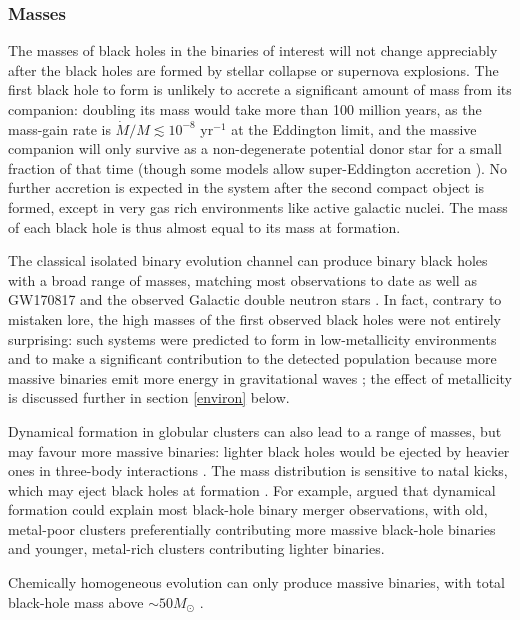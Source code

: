 \documentclass[review]{elsarticle}
\begin{document}
\subsubsection{Masses}
The masses of black holes in the binaries of interest will not change appreciably after the black holes are formed by stellar collapse or supernova explosions.  The first black hole to form is unlikely to accrete a significant amount of mass from its companion: doubling its mass would take more than 100 million years, as the mass-gain rate is $\dot{M}/M \lesssim 10^{-8}$ yr$^{-1}$ at the Eddington limit, and the massive companion will only survive as a non-degenerate potential donor star for a small fraction of that time (though some models allow super-Eddington accretion \cite{Eldridge:2017,Bavera:2020,vanSon:2020}). No further accretion is expected in the system after the second compact object is formed, except in very gas rich environments like active galactic nuclei. The mass of each black hole is thus almost equal to its mass at formation. 

The classical isolated binary evolution channel can produce binary black holes with a broad range of masses, matching most observations to date \citep[e.g.,][]{Stevenson:2017,Eldridge:2017,GiacobboMapelli:2018} as well as GW170817 and the observed Galactic double neutron stars \citep[e.g.,][]{Kruckow:2018,VignaGomez:2018}.  In fact, contrary to mistaken lore, the high masses of the first observed black holes were not entirely surprising: such systems were predicted to form in low-metallicity environments \citep{Mapelli:2009,Belczynski:2009} and to make a significant contribution to the detected population because more massive binaries emit more energy in gravitational waves \citep{Dominik:2014}; the effect of metallicity is discussed further in section \ref{environ} below. 

Dynamical formation in globular clusters can also lead to a range of masses, but may favour more massive binaries: lighter black holes would be ejected by heavier ones in three-body interactions \citep{Rodriguez:2015}. The mass distribution is sensitive to natal kicks, which may eject black holes at formation \citep{Zevin:2017}.  For example, \citet{Chatterjee:2017} argued that dynamical formation could explain most black-hole binary merger observations, with old, metal-poor clusters preferentially contributing more massive black-hole binaries and younger, metal-rich clusters contributing lighter binaries.
 
Chemically homogeneous evolution can only produce massive binaries, with total black-hole mass above $\sim 50 M_\odot$ \citep{MandeldeMink:2016,Marchant:2016}.
\end{document}
